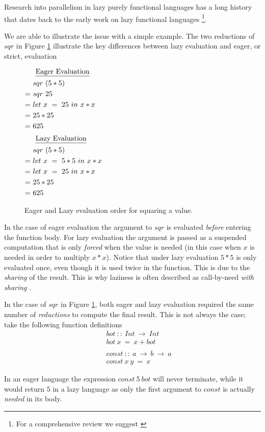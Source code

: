 Research into parallelism in lazy purely functional languages has a long
history that dates back to the early work on lazy functional languages
\citep{hughes:thesis, vGMachine, dutchBook, SPJ:PIFPL}\footnote{For a
comprehensive review we suggest \citep{hammond2000research}}. 


We are able to illustrate the issue with a simple example.  The two reductions
of $sqr$ in Figure \ref{fig:eagerandlazy} illustrate the key differences
between lazy evaluation and eager, or strict, evaluation


\begin{figure}[!h]
\centering
\begin{multicols}{2}
\noindent
\begin{align*}
     \noalign{$\text{\underline{Eager Evaluation}}$}
     &sqr\ (5*5) \\
  =\ &sqr\ 25 \\
  =\ &let\ x\ =\ 25\ in\ x * x \\
  =\ &25 * 25 \\
  =\ &625
\end{align*}
\begin{align*}
     \noalign{$\text{\underline{Lazy Evaluation}}$}
     &sqr\ (5*5) \\
  =\ &let\ x\ =\ 5*5\ in\ x * x \\
  =\ &let\ x\ =\ 25\ in\ x * x \\
  =\ &25 * 25 \\
  =\ &625
\end{align*}
\end{multicols}
\caption{Eager and Lazy evaluation order for squaring a value.}
\label{fig:eagerandlazy}
\end{figure}

In the case of eager evaluation the argument to $sqr$ is evaluated
\emph{before} entering the function body. For lazy evaluation the argument is
passed as a suspended computation that is only \emph{forced} when the value is
needed (in this case when $x$ is needed in order to multiply $x*x$). Notice
that under lazy evaluation $5*5$ is only evaluated once, even though it is
used twice in the function. This is due to the \emph{sharing} of the result.
This is why laziness is often described as call-by-need \emph{with sharing}
\citep{hammond2000research}.

\medskip

In the case of $sqr$ in Figure \ref{fig:eagerandlazy}, both eager and lazy
evaluation required the same number of \emph{reductions} to compute the final
result. This is not always the case; take the following function definitions
\begin{align*}
    &bot \ :: \ Int\ \rightarrow\ Int \\
    &bot\ x\ =\ x + bot \\
    \quad & \\
    &const\ :: \ a\ \rightarrow\ b\ \rightarrow\ a \\
    &const\ x\ y\ =\ x
\end{align*}
\label{fig:botAndConst}

In an eager language the expression $const\ 5\ bot$ will never terminate,
while it would return $5$ in a lazy language as only the first argument
to $const$ is actually \emph{needed} in its body.

\medskip


